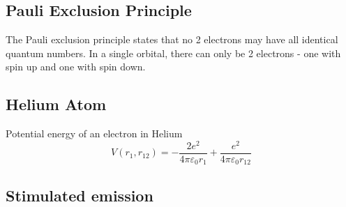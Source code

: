 \subsection{Pauli Exclusion Principle}
The Pauli exclusion principle states that no 2 electrons may have all identical quantum numbers. 
In a single orbital, there can only be 2 electrons - one with spin up and one with spin down.

\subsection{Helium Atom}
Potential energy of an electron in Helium
\begin{equation}
    V(r_1,r_{12}) = -\frac{2e^2}{4 \pi \varepsilon_0 r_1} + \frac{e^2}{4 \pi \varepsilon_0 r_{12}}
\end{equation}

\subsection{Stimulated emission}
